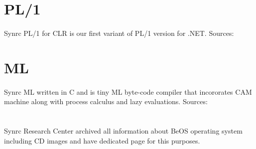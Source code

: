 \documentclass[11pt]{article}
\begin{document}
\section*{PL/1}
\paragraph{}
Synrc PL/1 for CLR is our first variant of PL/1 version for .NET.
Sources: 

\section*{ML}
\paragraph{}
Synrc ML written in C and is tiny ML byte-code compiler that incororates CAM machine
along with process calculus and lazy evaluations.
Sources: 

\section*{}
\paragraph{}
Synrc Research Center archived all information about BeOS operating system 
including CD images and have dedicated page for this purposes.



\end{document}
